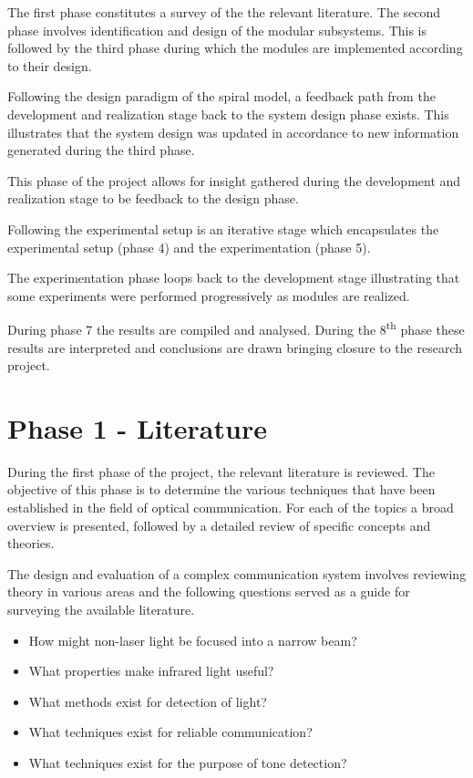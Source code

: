 The first phase constitutes a survey of the the relevant literature. The second phase involves identification and design of the modular subsystems. This is followed by the third phase during which the modules are implemented according to their design.

Following the design paradigm of the spiral model, a feedback path from the development and realization stage back to the system design phase exists. This illustrates that the system design was updated in accordance to new information generated during the third phase. %

This phase of the project allows for insight gathered during the development and realization stage to be feedback to the design phase.

Following the experimental setup is an iterative stage which encapsulates the experimental setup (phase 4) and the experimentation (phase 5).

The experimentation phase loops back to the development stage illustrating that some experiments were performed progressively as modules are realized. 

During phase 7 the results are compiled and analysed. During the 8\textsuperscript{th} phase these results are interpreted and conclusions are drawn bringing closure to the research project.


\section{Phase 1 - Literature}

During the first phase of the project, the relevant literature is reviewed. The objective of this phase is to determine the various techniques that have been established in the field of optical communication. For each of the topics a broad overview is presented, followed by a detailed review of specific concepts and theories.

The design and evaluation of a complex communication system involves reviewing theory in various areas and the following questions served as a guide for surveying the available literature.

\begin{itemize}
	\item How might non-laser light be focused into a narrow beam? %
	\item What properties make infrared light useful? %
	\item What methods exist for detection of light? %
	\item What techniques exist for reliable communication? %
	\item What techniques exist for the purpose of tone detection? %
\end{itemize}

